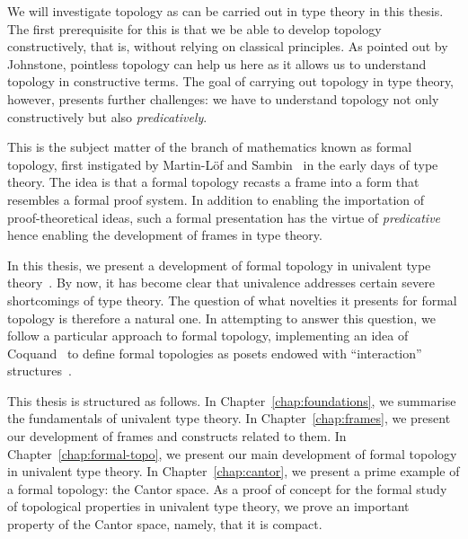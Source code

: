 We will investigate topology as can be carried out in type theory in this thesis. The
first prerequisite for this is that we be able to develop topology constructively, that
is, without relying on classical principles. As pointed out by Johnstone, pointless
topology can help us here as it allows us to understand topology in constructive terms.
The goal of carrying out topology in type theory, however, presents further challenges: we
have to understand topology not only constructively but also \emph{predicatively}.

This is the subject matter of the branch of mathematics known as formal topology, first
instigated by Martin-Löf and Sambin~\cite{int-formal-spaces} in the early days of type
theory. The idea is that a formal topology recasts a frame into a form that resembles a
formal proof system. In addition to enabling the importation of proof-theoretical ideas,
such a formal presentation has the virtue of \emph{predicative} hence enabling the
development of frames in type theory.

In this thesis, we present a development of formal topology in univalent type
theory~\cite{hottbook}. By now, it has become clear that univalence addresses certain
severe shortcomings of type theory. The question of what novelties it presents for formal
topology is therefore a natural one. In attempting to answer this question, we follow a
particular approach to formal topology, implementing an idea of Coquand~\cite{coq-posets}
to define formal topologies as posets endowed with ``interaction''
structures~\cite{tree-sets, hancock-interaction-systems}.

This thesis is structured as follows. In Chapter~\ref{chap:foundations}, we summarise the
fundamentals of univalent type theory. In Chapter~\ref{chap:frames}, we present our
development of frames and constructs related to them. In Chapter~\ref{chap:formal-topo},
we present our main development of formal topology in univalent type theory. In
Chapter~\ref{chap:cantor}, we present a prime example of a formal topology: the Cantor
space. As a proof of concept for the formal study of topological properties in univalent
type theory, we prove an important property of the Cantor space, namely, that it is
compact.

